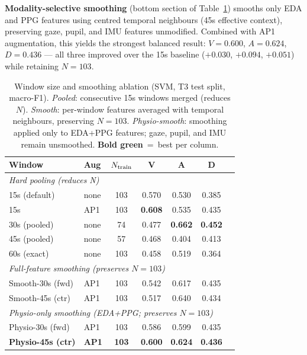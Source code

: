 \documentclass[sigconf,review,anonymous]{acmart}
\newcommand{\best}[1]{\textbf{\textcolor{bestcol}{#1}}}
\begin{document}
\textbf{Modality-selective smoothing} (bottom section of Table~\ref{tab:window})
smooths only EDA and PPG features using centred temporal neighbours (45s
effective context), preserving gaze, pupil, and IMU features unmodified.
Combined with AP1 augmentation, this yields the strongest balanced result:
$V{=}0.600$, $A{=}0.624$, $D{=}0.436$ --- all three improved over the 15s
baseline ($+0.030$, $+0.094$, $+0.051$) while retaining $N{=}103$.

\begin{table}[t]
\caption{Window size and smoothing ablation (SVM, T3 test split, macro-F1).
  \emph{Pooled}: consecutive 15s windows merged (reduces $N$).
  \emph{Smooth}: per-window features averaged with temporal neighbours,
  preserving $N{=}103$.
  \emph{Physio-smooth}: smoothing applied only to EDA+PPG features;
  gaze, pupil, and IMU remain unsmoothed.
  \best{Bold green}~=~best per column.}
\label{tab:window}
\centering
\setlength{\tabcolsep}{4pt}
\small
\begin{tabular}{llccccc}
\toprule
\textbf{Window} & \textbf{Aug} & \textbf{$N_{\rm train}$} &
  \textbf{V} & \textbf{A} & \textbf{D} \\
\midrule
\multicolumn{6}{l}{\textit{Hard pooling (reduces N)}} \\
15s (default)       & none & 103 & 0.570 & 0.530 & 0.385 \\
15s                 & AP1  & 103 & \best{0.608} & 0.535 & 0.435 \\
30s (pooled)        & none & 74  & 0.477 & \best{0.662} & \best{0.452} \\
45s (pooled)        & none & 57  & 0.468 & 0.404 & 0.413 \\
60s (exact)         & none & 103 & 0.458 & 0.519 & 0.364 \\
\midrule
\multicolumn{6}{l}{\textit{Full-feature smoothing (preserves $N{=}103$)}} \\
Smooth-30s (fwd)    & AP1  & 103 & 0.542 & 0.617 & 0.435 \\
Smooth-45s (ctr)    & AP1  & 103 & 0.517 & 0.640 & 0.434 \\
\midrule
\multicolumn{6}{l}{\textit{Physio-only smoothing (EDA+PPG; preserves $N{=}103$)}} \\
Physio-30s (fwd)    & AP1  & 103 & 0.586 & 0.599 & 0.435 \\
\textbf{Physio-45s (ctr)} & \textbf{AP1} & \textbf{103} & \best{0.600} & \best{0.624} & \best{0.436} \\
\bottomrule
\end{tabular}
\end{table}
\end{document}
